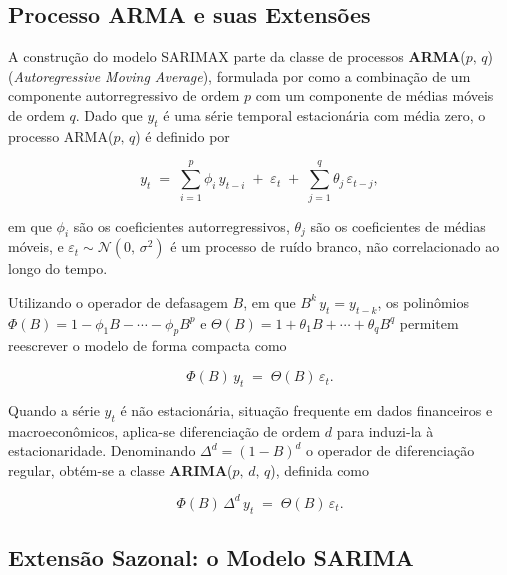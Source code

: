 \subsection{Processo ARMA e suas Extensões}
\label{sec:arma}
 
A construção do modelo SARIMAX parte da classe de processos
\textbf{ARMA}(\(p,\,q\)) (\textit{Autoregressive Moving Average}),
formulada por \citet{box2015} como a combinação de um componente
autorregressivo de ordem \(p\) com um componente de médias móveis de ordem
\(q\). Dado que \(y_t\) é uma série temporal estacionária com média zero, o
processo ARMA(\(p,\,q\)) é definido por
 
\begin{equation}
  y_t \;=\; \sum_{i=1}^{p} \phi_i\, y_{t-i}
           \;+\; \varepsilon_t
           \;+\; \sum_{j=1}^{q} \theta_j\, \varepsilon_{t-j},
  \label{eq:arma}
\end{equation}
 
\noindent
em que \(\phi_i\) são os coeficientes autorregressivos, \(\theta_j\) são os
coeficientes de médias móveis, e \(\varepsilon_t \sim \mathcal{N}(0,\,\sigma^2)\)
é um processo de ruído branco, não correlacionado ao longo do tempo.
 
Utilizando o operador de defasagem \(B\), em que \(B^k\,y_t = y_{t-k}\),
os polinômios \(\Phi(B) = 1 - \phi_1 B - \cdots - \phi_p B^p\) e
\(\Theta(B) = 1 + \theta_1 B + \cdots + \theta_q B^q\) permitem reescrever
o modelo de forma compacta como
 
\begin{equation}
  \Phi(B)\,y_t \;=\; \Theta(B)\,\varepsilon_t.
  \label{eq:arma_compact}
\end{equation}
 
Quando a série \(y_t\) é não estacionária, situação frequente em dados
financeiros e macroeconômicos, aplica-se diferenciação de ordem \(d\)
para induzi-la à estacionaridade. Denominando \(\Delta^d = (1-B)^d\) o
operador de diferenciação regular, obtém-se a classe
\textbf{ARIMA}(\(p,\,d,\,q\)), definida como 
 
\begin{equation}
  \Phi(B)\,\Delta^d\,y_t \;=\; \Theta(B)\,\varepsilon_t.
  \label{eq:arima}
\end{equation}
 
\subsection{Extensão Sazonal: o Modelo SARIMA}
\label{sec:sarima}
 
